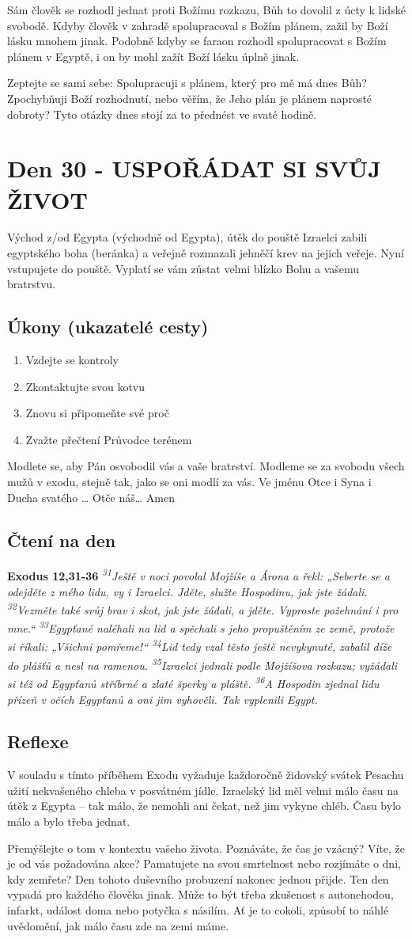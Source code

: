 \documentclass[11pt]{article}
\newcommand{\zacatekPatyTyden}{
  Východ z/od Egypta (východně od Egypta), útěk do pouště \newline
  Izraelci zabili egyptského boha (beránka) a veřejně rozmazali jehněčí krev na jejich veřeje. Nyní vstupujete
  do pouště. Vyplatí se vám zůstat velmi blízko Bohu a vašemu bratrstvu.

\subsection*{Úkony (ukazatelé cesty)}
\begin{enumerate}
  \item Vzdejte se kontroly
  \item Zkontaktujte svou kotvu
  \item Znovu si připomeňte své proč
  \item Zvažte přečtení Průvodce terénem
\end{enumerate}
Modlete se, aby Pán osvobodil vás a vaše bratrství. \newline
Modleme se za svobodu všech mužů v exodu, stejně tak, jako se oni modlí za vás.\newline
Ve jménu Otce i Syna i Ducha svatého …  Otče náš… Amen
}
\begin{document}
Sám člověk se rozhodl jednat proti Božímu rozkazu, Bůh to dovolil z úcty k lidské svobodě. Kdyby člověk v
zahradě spolupracoval s Božím plánem, zažil by Boží lásku mnohem jinak. Podobně kdyby se faraon rozhodl
spolupracovat s Božím plánem v Egyptě, i on by mohl zažít Boží lásku úplně jinak.

Zeptejte se sami sebe: Spolupracuji s plánem, který pro mě má dnes Bůh? Zpochybňuji Boží rozhodnutí,
nebo věřím, že Jeho plán je plánem naprosté dobroty? Tyto otázky dnes stojí za to přednést ve svaté hodině.


\newpage
\section{Den 30 - USPOŘÁDAT SI SVŮJ ŽIVOT}
\zacatekPatyTyden
\subsection*{Čtení na den}
\textbf{Exodus 12,31-36}
\newline
\textit{
\textsuperscript{31}Ještě v noci povolal Mojžíše a Árona a řekl: „Seberte se a odejděte z mého lidu, vy i Izraelci. Jděte, služte Hospodinu, jak jste žádali.
\textsuperscript{32}Vezměte také svůj brav i skot, jak jste žádali, a jděte. Vyproste požehnání i pro mne.“
\textsuperscript{33}Egypťané naléhali na lid a spěchali s jeho propuštěním ze země, protože si říkali: „Všichni pomřeme!“
\textsuperscript{34}Lid tedy vzal těsto ještě nevykynuté, zabalil díže do plášťů a nesl na ramenou.
\textsuperscript{35}Izraelci jednali podle Mojžíšova rozkazu; vyžádali si též od Egypťanů stříbrné a zlaté šperky a pláště.
\textsuperscript{36}A Hospodin zjednal lidu přízeň v očích Egypťanů a oni jim vyhověli. Tak vyplenili Egypt.
}

\subsection*{Reflexe}

V souladu s tímto příběhem Exodu vyžaduje každoročně židovský svátek Pesachu užití nekvašeného chleba
v posvátném jídle. Izraelský lid měl velmi málo času na útěk z Egypta – tak málo, že nemohli ani čekat, než jim
vykyne chléb. Času bylo málo a bylo třeba jednat.

Přemýšlejte o tom v kontextu vašeho života. Poznáváte, že čas je vzácný? Víte, že je od vás požadována akce?
Pamatujete na svou smrtelnost nebo rozjímáte o dni, kdy zemřete? Den tohoto duševního probuzení nakonec jednou
přijde. Ten den vypadá pro každého člověka jinak. Může to být třeba zkušenost s autonehodou, infarkt, událost doma
nebo potyčka s násilím. Ať je to cokoli, způsobí to náhlé uvědomění, jak málo času zde na zemi máme.
\end{document}
